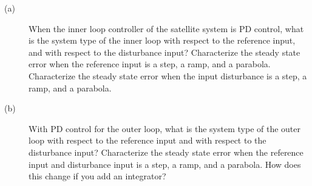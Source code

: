 

\begin{description} \item[]
\item[(a)] When the inner loop controller of the satellite system is PD control, what is the system type of the inner loop with respect to the reference input, and with respect to the disturbance input?  Characterize the steady state error when the reference input is a step, a ramp, and a parabola.  Characterize the steady state error when the input disturbance is a step, a ramp, and a parabola.
\item[(b)] With PD control for the outer loop, what is the system type of the outer loop with respect to the reference input and with respect to the disturbance input?  Characterize the steady state error when the reference input and disturbance input is a step, a ramp, and a parabola.  How does this change if you add an integrator?
\end{description}